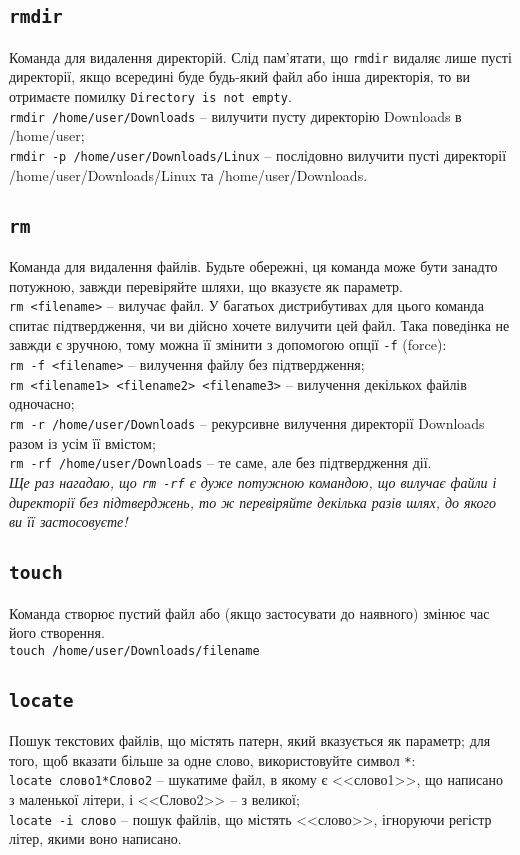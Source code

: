 \documentclass[10pt,a4paper]{fancyhandout}
\begin{document}
\subsection{\texttt{rmdir}}
Команда для видалення директорій.
Слід пам'ятати, що \texttt{rmdir} видаляє лише пусті директорії, якщо всередині буде будь-який файл або інша директорія, то ви отримаєте помилку \texttt{Directory is not empty}. \\
\texttt{rmdir /home/user/Downloads} -- вилучити пусту директорію Downloads в /home/user;\\
\texttt{rmdir -p /home/user/Downloads/Linux} -- послідовно вилучити пусті директорії /home/user/Downloads/Linux та /home/user/Downloads.  
\goodbreak

\subsection{\texttt{rm}}
Команда для видалення файлів. Будьте обережні, ця команда може бути занадто потужною, завжди перевіряйте шляхи, що вказуєте як параметр. \\
\texttt{rm <filename>} -- вилучає файл. У багатьох дистрибутивах для цього команда спитає підтвердження, чи ви дійсно хочете вилучити цей файл. Така поведінка не завжди є зручною, тому можна її змінити з допомогою опції \texttt{-f} (force): \\
\texttt{rm -f <filename>} -- вилучення файлу без підтвердження; \\
\texttt{rm <filename1> <filename2> <filename3>} -- вилучення декількох файлів одночасно; \\
\texttt{rm -r /home/user/Downloads} -- рекурсивне вилучення директорії Downloads разом із усім її вмістом; \\
\texttt{rm -rf /home/user/Downloads} -- те саме, але без підтвердження дії. \\
\textit{Ще раз нагадаю, що \texttt{rm -rf} є дуже потужною командою, що вилучає файли і директорії без підтверджень, то ж перевіряйте декілька разів шлях, до якого ви її застосовуєте!}
\goodbreak

\subsection{\texttt{touch}}
Команда створює пустий файл або (якщо застосувати до наявного) змінює час його створення. \\
\texttt{touch /home/user/Downloads/filename}
\goodbreak

\subsection{\texttt{locate}}
Пошук текстових файлів, що містять патерн, який вказується як параметр; для того, щоб вказати більше за одне слово, використовуйте символ \texttt{*}: \\
\texttt{locate слово1*Слово2} -- шукатиме файл, в якому є <<слово1>>, що написано з маленької літери, і <<Слово2>> -- з великої; \\
\texttt{locate -i слово} -- пошук файлів, що містять <<слово>>, ігноруючи регістр літер, якими воно написано. 
\goodbreak
\end{document}
